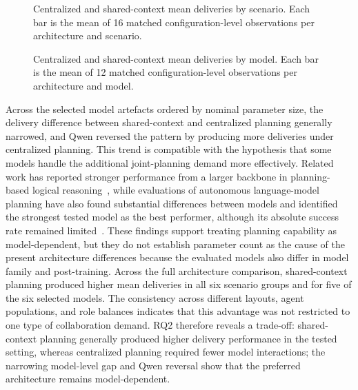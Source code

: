 \begin{figure}[H]
\centering
\ChartArchitectureScenarios
\caption{Centralized and shared-context mean deliveries by scenario. Each bar is the mean of 16 matched configuration-level observations per architecture and scenario.}
\label{fig:centralized_shared_deliveries_scenario}
\end{figure}

\begin{figure}[H]
\centering
\ChartArchitectureModels
\caption{Centralized and shared-context mean deliveries by model. Each bar is the mean of 12 matched configuration-level observations per architecture and model.}
\label{fig:centralized_shared_deliveries_model}
\end{figure}

Across the selected model artefacts ordered by nominal parameter size, the delivery difference between shared-context and centralized planning generally narrowed, and Qwen reversed the pattern by producing more deliveries under centralized planning. This trend is compatible with the hypothesis that some models handle the additional joint-planning demand more effectively. Related work has reported stronger performance from a larger backbone in planning-based logical reasoning~\cite{zhao2023explicitplanning}, while evaluations of autonomous language-model planning have also found substantial differences between models and identified the strongest tested model as the best performer, although its absolute success rate remained limited~\cite{valmeekam2023planning}. These findings support treating planning capability as model-dependent, but they do not establish parameter count as the cause of the present architecture differences because the evaluated models also differ in model family and post-training. Across the full architecture comparison, shared-context planning produced higher mean deliveries in all six scenario groups and for five of the six selected models. The consistency across different layouts, agent populations, and role balances indicates that this advantage was not restricted to one type of collaboration demand. RQ2 therefore reveals a trade-off: shared-context planning generally produced higher delivery performance in the tested setting, whereas centralized planning required fewer model interactions; the narrowing model-level gap and Qwen reversal show that the preferred architecture remains model-dependent.

